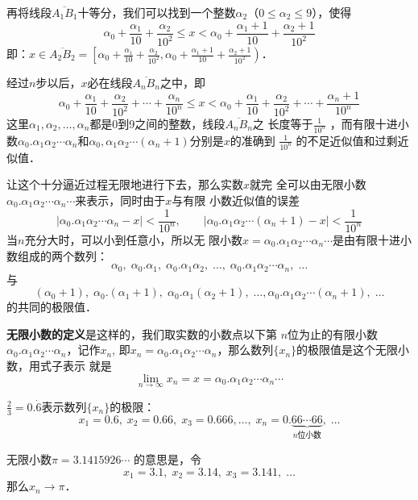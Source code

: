 再将线段$\overline{A_1B_1}$十等分，我们可以找到一个整数$\alpha_2$（$0\le \alpha_2\le 9$），使得
\[\alpha_0+\frac{\alpha_1}{10}+\frac{\alpha_2}{10^2}\le x<\alpha_0+\frac{\alpha_1+1}{10}+\frac{\alpha_2+1}{10^2}\]
即：$x\in\overline{A_2B_2}=\left[\alpha_0+\frac{\alpha_1}{10}+\frac{\alpha_2}{10^2}, \alpha_0+\frac{\alpha_1+1}{10}+\frac{\alpha_2+1}{10^2}\right)$．

经过$n$步以后，$x$必在线段$\overline{A_nB_n}$之中，即
\[\alpha_0+\frac{\alpha_1}{10}+\frac{\alpha_2}{10^2}+\cdots+\frac{\alpha_n}{10^n}\le x<\alpha_0+\frac{\alpha_1}{10}+\frac{\alpha_2}{10^2}+\cdots+\frac{\alpha_n+1}{10^n}\]
这里$\alpha_1,\alpha_2,\ldots,\alpha_n$都是0到9之间的整数，线段$\overline{A_nB_n}$之
长度等于$\frac{1}{10^n}$
，而有限十进小数$\alpha_0.\alpha_1\alpha_2\cdots\alpha_n$和$\alpha_0,\alpha_1\alpha_2\cdots(\alpha_n+1)$分别是$x$的准确到
$\frac{1}{10^n}$
的不足近似值和过剩近似值．

让这个十分逼近过程无限地进行下去，那么实数$x$就完
全可以由无限小数$\alpha_0.\alpha_1\alpha_2\cdots\alpha_n\cdots$来表示，同时由于$x$与有限
小数近似值的误差
\[|\alpha_0.\alpha_1\alpha_2\cdots\alpha_n-x|<\frac{1}{10^n},\qquad  |\alpha_0.\alpha_1\alpha_2\cdots(\alpha_n+1)-x|<\frac{1}{10^n}\]
当$n$充分大时，可以小到任意小，所以无
限小数$x=\alpha_0.\alpha_1\alpha_2\cdots\alpha_n\cdots$是由有限十进小数组成的两个数列：
\[\alpha_0,\; \alpha_0.\alpha_1,\;\alpha_0.\alpha_1\alpha_2,\;\ldots,\;  \alpha_0.\alpha_1\alpha_2\cdots\alpha_n,\;\ldots\]
与
\[(\alpha_0+1),\; \alpha_0.(\alpha_1+1),\;\alpha_0.\alpha_1(\alpha_2+1),\;\ldots, \alpha_0.\alpha_1\alpha_2\cdots(\alpha_n+1),\;\ldots\]
的共同的极限值．

\textbf{无限小数的定义}是这样的，我们取实数的小数点以下第
$n$位为止的有限小数$\alpha_0.\alpha_1\alpha_2\cdots\alpha_n$，记作$x_n$, 即$x_n=\alpha_0.\alpha_1\alpha_2\cdots\alpha_n$，那么数列$\{x_n\}$的极限值是这个无限小数，用式子表示
就是
\[\lim_{n\to\infty}x_n=x=\alpha_0.\alpha_1\alpha_2\cdots\alpha_n\cdots\]


\begin{example}
$\frac{2}{3}=0.\dot{6}$表示数列$\{x_n\}$的极限：
\[x_1=0.6,\; x_2=0.66,\; x_3=0.666,\ldots,\; x_n=0.\underbrace{66\cdots 66}_{\text{$n$位小数}},\; \ldots\]
\end{example}

\begin{example}
    无限小数$\pi=3.1415926\cdots$
    的意思是，令
   \[ x_1=3.1,\; x_2=3.14,\; x_3=3.141,\; \ldots\]
    那么$x_n\to \pi$．
\end{example}

